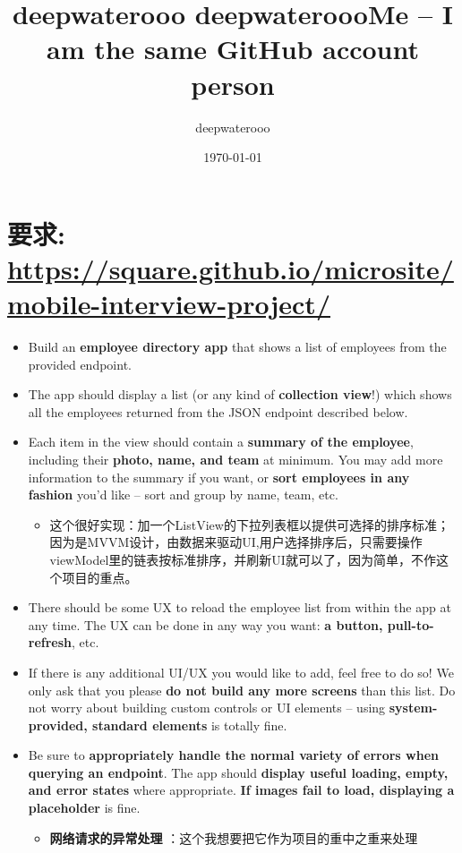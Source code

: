 \documentclass[9pt, b5paper]{article}
\author{deepwaterooo}
\date{\today}
\title{deepwaterooo deepwateroooMe -- I am the same GitHub account person}
\begin{document}
\maketitle
\tableofcontents


\section{要求: \url{https://square.github.io/microsite/mobile-interview-project/}}
\label{sec-1}
\begin{itemize}
\item Build an \textbf{employee directory app} that shows a list of employees from the provided endpoint.
\item The app should display a list (or any kind of \textbf{collection view}!) which shows all the employees returned from the JSON endpoint described below.
\item Each item in the view should contain a \textbf{summary of the employee}, including their \textbf{photo, name, and team} at minimum. You may add more information to the summary if you want, or \textbf{sort employees in any fashion} you’d like – sort and group by name, team, etc.
\begin{itemize}
\item 这个很好实现：加一个ListView的下拉列表框以提供可选择的排序标准；因为是MVVM设计，由数据来驱动UI,用户选择排序后，只需要操作viewModel里的链表按标准排序，并刷新UI就可以了，因为简单，不作这个项目的重点。
\end{itemize}
\item There should be some UX to reload the employee list from within the app at any time. The UX can be done in any way you want: \textbf{a button, pull-to-refresh}, etc.
\item If there is any additional UI/UX you would like to add, feel free to do so! We only ask that you please \textbf{do not build any more screens} than this list. Do not worry about building custom controls or UI elements – using \textbf{system-provided, standard elements} is totally fine.
\item Be sure to \textbf{appropriately handle the normal variety of errors when querying an endpoint}. The app should \textbf{display useful loading, empty, and error states} where appropriate. \textbf{If images fail to load, displaying a placeholder} is fine.
\begin{itemize}
\item \textbf{网络请求的异常处理} ：这个我想要把它作为项目的重中之重来处理
\end{itemize}

\end{itemize}
\end{document}
